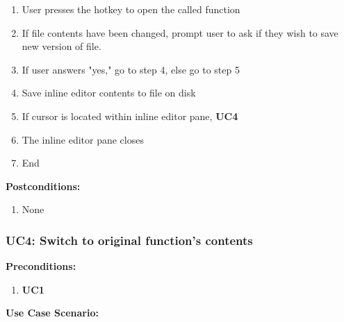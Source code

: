 \documentclass[]{report}
\begin{document}
		\begin{enumerate}
			\item
			User presses the hotkey to open the called function
			
			\item 
			If file contents have been changed, prompt user to ask if they wish to save new version of file.
			
			\item
			If user answers "yes," go to step 4, else go to step 5
				
			\item 
			Save inline editor contents to file on disk
			
			\item 
			If cursor is located within inline editor pane, \textbf{UC4}
			
			\item 
			The inline editor pane closes
			
			\item
			End
		\end{enumerate}
		
		\noindent\textbf{Postconditions:}
		
		\begin{enumerate}
			
			\item 
			None
			
		\end{enumerate}
		
		\vspace{0.25in}
		
		\subsubsection{UC4:  Switch to original function's contents}
		
		\textbf{Preconditions:}
		
		\begin{enumerate}
			
			\item \textbf{UC1}
			
		\end{enumerate}
		
		\noindent\textbf{Use Case Scenario:}
		
\end{document}
